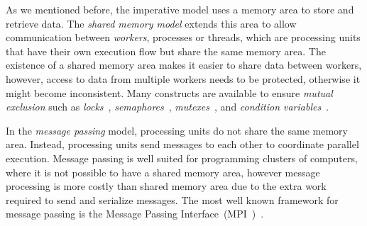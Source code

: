 As we mentioned before, the imperative model uses a memory area to store and
retrieve data. The \emph{shared memory model} extends this area to allow
communication between \emph{workers}, processes or threads, which are processing
units that have their own execution flow but share the same memory area. The
existence of a shared memory area makes it easier to share data between workers,
however, access to data from multiple workers needs to be protected, otherwise
it might become inconsistent. Many constructs are available to ensure
\emph{mutual exclusion} such as \emph{locks}~\cite{Silberschatz:2008},
\emph{semaphores}~\cite{Dijkstra:2002}, \emph{mutexes}~\cite{Silberschatz:2008},
and \emph{condition variables}~\cite{Hoare:1974}.

In the \emph{message passing} model, processing units do not share the same
memory area. Instead, processing units send messages to each other to coordinate
parallel execution. Message passing is well suited for programming clusters of
computers, where it is not possible to have a shared memory area, however
message processing is more costly than shared memory area due to the extra work
required to send and serialize messages.  The most well known framework for
message passing is the Message Passing Interface~(MPI~)~\cite{Forum:1994}.
